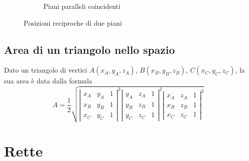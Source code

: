 \documentclass{article}     %
\begin{document}
\begin{center}
\begin{figure}[h!]
\begin{subfigure}{0.3\textwidth}
\begin{center}
                        \end{center}
                        \caption{Piani paralleli coincidenti}
                    \end{subfigure}
                    \caption{Posizioni reciproche di due piani}
                \end{figure}
            \end{center}
        \subsection{Area di un triangolo nello spazio}
            Dato un triangolo di vertici $A(x_A,y_A,z_A)$, $B(x_B,y_B,z_B)$, $C(x_C,y_C,z_C)$, la sua area è data dalla formula 
            \[A=\frac{1}{2}\sqrt{\left|\begin{array}{ccc}
                x_A & y_A & 1\\
                x_B & y_B & 1\\
                x_C & y_C & 1
            \end{array}\right|^2
            \left|\begin{array}{ccc}
                y_A & z_A & 1\\
                y_B & z_B & 1\\
                y_C & z_C & 1
            \end{array}\right|^2
            \left|\begin{array}{ccc}
                x_A & z_A & 1\\
                x_B & z_B & 1\\
                x_C & z_C & 1
            \end{array}\right|^2
            }\]
    \section{Rette}
\end{document}
